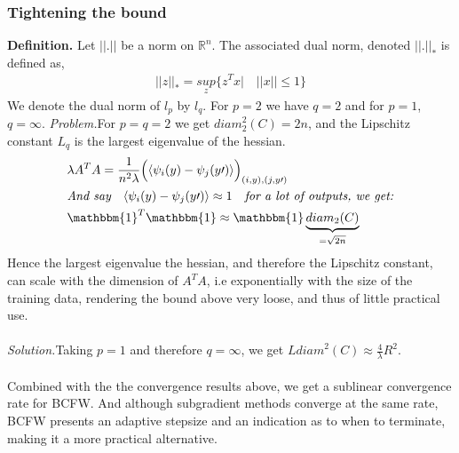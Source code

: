 \documentclass{article}
\begin{document}
\subsubsection{Tightening the bound}
\textbf{Definition.} Let $||.||$ be a norm on $\mathbb{R}^{n}$. The associated dual norm, denoted $||.||_{*}$ is defined as,
\begin{equation*}
\begin{aligned}
    ||z||_{*}= \underset{z}{\textit{sup}} \{z^{T}x|\quad||x||\leq1\}
\end{aligned}
\end{equation*}
We denote the dual norm of $l_{p}$ by $l_{q}$. For $p=2$ we have $q=2$ and for $p=1$, $q=\infty$.
\textit{Problem.}\quad For $p= q= 2$ we get $\textit{diam}_{2}^{2}(C)= 2n$, and the Lipschitz constant $L_{q}$ is the largest eigenvalue of the hessian.
\begin{equation*}
\begin{aligned}
    &\lambda A^{T}A= \frac{1}{n^{2}\lambda}\Big(\langle \psi_{i}(y)- \psi_{j}(y\prime) \rangle\Big)_{(i,y),(j,y\prime)}\\
    &\textit{And say}\quad \langle \psi_{i}(y)- \psi_{j}(y\prime) \rangle \approx  1\quad\textit{for a lot of outputs, we get:}\\
    &\mathbbm{1}^{T}\mathbbm{1}\approx \mathbbm{1}\underbrace{diam_{2}(C)}_{=\sqrt{2n}}
\end{aligned} 
\end{equation*}
Hence the largest eigenvalue the hessian, and therefore the Lipschitz constant, can scale with the dimension of $A^{T}A$, i.e exponentially with the size of the training data, rendering the bound above very loose, and thus of little practical use.
\\
\\
\textit{Solution.}\quad Taking $p=1$ and therefore $q=\infty$, we get $L\textit{diam}^{2}(C)\approx \frac{4}{\lambda}R^{2}$.\\
\\
Combined with the the convergence results above, we get a sublinear convergence rate for BCFW. And although subgradient methods converge at the same rate, BCFW presents an adaptive stepsize and an indication as to when to terminate, making it a more practical alternative.
\end{document}
